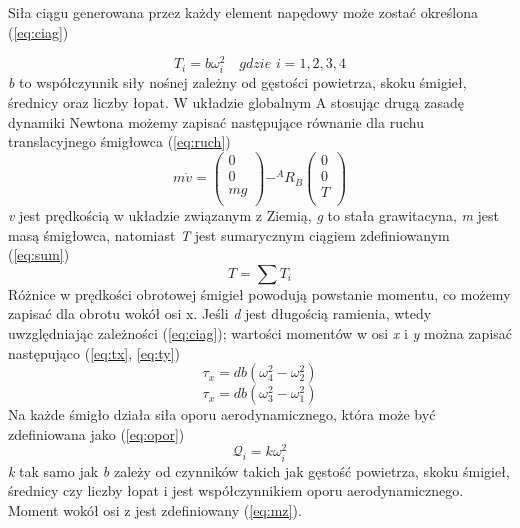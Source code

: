 \documentclass[polish,11pt,a4paper]{article}
\begin{document}
Siła ciągu generowana przez każdy element napędowy może zostać określona (\ref{eq:ciag})

\begin{equation}
	T_i = b \omega_i^2 \quad gdzie \, \, i = 1,2,3,4
	\label{eq:ciag}
\end{equation}
\textit{b} to współczynnik siły nośnej zależny od gęstości powietrza, skoku śmigieł, średnicy oraz liczby łopat. W układzie globalnym {A} stosując drugą zasadę dynamiki Newtona możemy zapisać następujące równanie dla ruchu translacyjnego śmigłowca (\ref{eq:ruch})
\begin{equation}
	m\dot{v} = 
	\left(
		\begin{matrix}
		0 \\
		0 \\
		mg \\
		\end{matrix}
	\right) - ^{A}R_{B}
		\left(
	\begin{matrix}
		0 \\
		0 \\
		T \\
	\end{matrix} \right)
	\label{eq:ruch}
\end{equation}
\textit{v} jest prędkością w układzie związanym z Ziemią, \textit{g} to stała grawitacyna, \textit{m} jest masą śmigłowca, natomiast \textit{T} jest sumarycznym ciągiem zdefiniowanym (\ref{eq:sum}) 
\begin{equation}
	T = \sum T_i
	\label{eq:sum}
\end{equation}
Różnice w prędkości obrotowej śmigieł powodują powstanie momentu, co możemy zapisać dla obrotu wokół osi x. Jeśli \textit{d} jest długością ramienia, wtedy uwzględniając zależności (\ref{eq:ciag}); wartości momentów w osi \textit{x} i \textit{y} można zapisać następująco (\ref{eq:tx}, \ref{eq:ty})
\begin{equation}
	\tau_x = db(\omega_4^2 - \omega_2^2)
	\label{eq:tx}
\end{equation}
\begin{equation}
	\tau_x = db(\omega_3^2 - \omega_1^2)
	\label{eq:ty}
\end{equation}
Na każde śmigło działa siła oporu aerodynamicznego, która może być zdefiniowana jako (\ref{eq:opor})
\begin{equation}
	\mathcal{Q}_i = k \omega_i^2
	\label{eq:opor}
\end{equation}
\textit{k} tak samo jak \textit{b} zależy od czynników takich jak gęstość powietrza, skoku śmigieł, średnicy czy liczby łopat  i jest współczynnikiem oporu aerodynamicznego. Moment wokół osi z jest zdefiniowany (\ref{eq:mz}).
\end{document}
